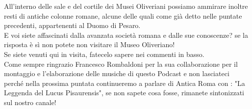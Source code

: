 \documentclass[hidelinks,12pt,a4paper]{article}
\begin{document}
\begin{flushleft}
		All'interno delle sale e del cortile dei Musei Oliveriani possiamo ammirare inoltre resti di antiche colonne romane, alcune delle quali come già detto nelle puntate precedenti, appartenenti al Duomo di Pesaro.\\
		E voi siete affascinati dalla avanzata società romana e dalle sue conoscenze? se la risposta è sì non potete non visitare il Museo Oliveriano! \\
		Se siete venuti qui in visita, fatecelo sapere nei commenti in basso.\\
		Come sempre ringrazio Francesco Rombaldoni per la sua collaborazione per il montaggio e l'elaborazione delle musiche di questo Podcast e non lasciateci perché nella prossima puntata continueremo a parlare di Antica Roma con : "La Leggenda del Lucus Pisaurensis", se non sapete cosa fosse, rimanete sintonizzati sul nostro canale!\\
		

\end{flushleft}
\end{document}
